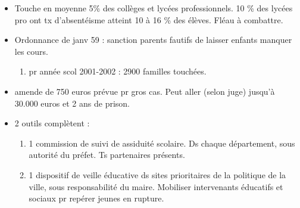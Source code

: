 \documentclass[12pt]{report}
\begin{document}
\begin{itemize}
\item Touche en moyenne 5\% des collèges et lycées professionnels. 10 \% des lycées pro ont tx d'absentéisme atteint 10 à 16 \% des élèves. Fléau à combattre. \\

\item Ordonnance de janv 59 : sanction parents fautifs de laisser enfants manquer les cours.
\begin{enumerate}
\item pr année scol 2001-2002 : 2900 familles touchées.
\end{enumerate}



\vspace{0.5cm}

\item amende de 750 euros prévue pr gros cas. Peut aller (selon juge) jusqu'à 30.000 euros et 2 ans de prison. \\

\item 2 outils complètent : 
\begin{enumerate}
\item 1 commission de suivi de assiduité scolaire. Ds chaque département, sous autorité du préfet. Ts partenaires présents. \\
\item 1 dispositif de veille éducative ds sites prioritaires de la politique de la ville, sous responsabilité du maire. Mobiliser intervenants éducatifs et sociaux pr repérer jeunes en rupture. \\
\end{enumerate}


\end{itemize}
\end{document}
